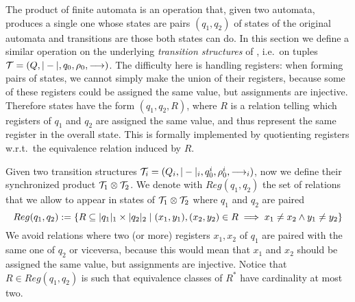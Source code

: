 \newcommand{\eq}[1]{#1}
\newcommand{\syncQ}{Q_{\syncp}}
\newcommand{\syncW}[1]{\weight{#1}_{\syncp}}
\newcommand{\syncAss}{\rho_0^{\syncp}}
\newcommand{\syncInit}{q_0^{\syncp}}
\newcommand{\syncTr}[1]{\xymatrix@C-=4ex{\ar[r]^{#1}&\!_{\syncp}}}
\newcommand{\syncHtr}[2]{\xymatrix@C-=4ex{\ar[r]^{#1}_{#2}&\!_{\syncp}}}
\newcommand{\regrule}{\textsc{(Reg)}}
\newcommand{\allrule}{\textsc{(Alloc)}}
\newcommand{\cproj}{\pi}

The product of finite automata is an operation that, given two automata, produces a single one whose states are pairs $(q_1,q_2)$ of states of the original automata and transitions are those both states can do. In this section we define a similar operation on the underlying \emph{transition structures} of \hdmas{}, i.e.\ on tuples $\mathcal{T} = (Q,|-|,q_0,\rho_0,\longrightarrow)$. The difficulty here is handling registers: when forming pairs of states, we cannot simply make the union of their registers, because some of these registers could be assigned the same value, but assignments are injective. Therefore states have the form $(q_1,q_2,R)$, where $R$ is a relation telling which registers of $q_1$ and $q_2$ are assigned the same value, and thus represent the same register in the overall state. This is formally implemented by quotienting registers w.r.t.\ the equivalence relation induced by $R$.

Given two transition structures $\mathcal{T}_i = (Q_i,|-|_i,q_0^i,\rho_0^i,\longrightarrow_i)$, now we define their synchronized product $\mathcal{T}_1 \otimes \mathcal{T}_2$. We denote with
$Reg(q_1,q_2)$ the set of relations that we allow to appear in states of $\mathcal{T}_1 \otimes \mathcal{T}_2$ where $q_1$ and $q_2$ are paired
\[
	Reg(q_1,q_2) := \{ R \subseteq |q_1|_1 \times |q_2|_2 \mid (x_1,y_1),(x_2,y_2) \in R \implies x_1 \neq x_2 \land y_1 \neq y_2 \}
\]
We avoid relations where two (or more) registers $x_1,x_2$ of $q_1$ are paired with the same one of $q_2$ or viceversa, because this would mean that $x_1$ and $x_2$ should be assigned the same value, but assignments are injective. Notice that $R \in Reg(q_1,q_2)$ is such that equivalence classes of $R^*$ have cardinality at most two.


